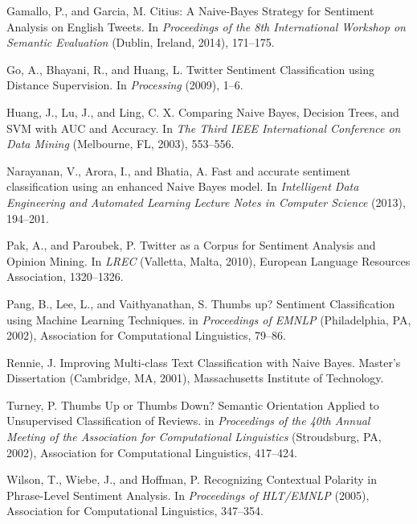 \documentclass[letter,12pt]{article}
\begin{document}
\begin{thebibliography}{9}

  Gamallo, P., and Garcia, M. Citius: A Naive-Bayes Strategy for Sentiment
  Analysis on English Tweets. In \emph{Proceedings of the 8th International
  Workshop on Semantic Evaluation} (Dublin, Ireland, 2014), 171--175.

  Go, A., Bhayani, R.,  and Huang, L. Twitter Sentiment Classification using
  Distance Supervision. In \emph{Processing} (2009), 1--6.

  Huang, J., Lu, J., and Ling, C. X. Comparing Naive Bayes, Decision Trees, and
  SVM with AUC and Accuracy. In \emph{The Third IEEE International Conference
  on Data Mining} (Melbourne, FL, 2003), 553--556.

  Narayanan, V., Arora, I., and Bhatia, A. Fast and accurate sentiment
  classification using an enhanced Naive Bayes model. In \emph{Intelligent Data
  Engineering and Automated Learning Lecture Notes in Computer Science} (2013),
  194--201.

  Pak, A., and Paroubek, P. Twitter as a Corpus for Sentiment Analysis and
  Opinion Mining. In \emph{LREC} (Valletta, Malta, 2010), European Language
  Resources Association, 1320--1326.

  Pang, B., Lee, L., and Vaithyanathan, S.
  Thumbs up? Sentiment Classification using Machine Learning Techniques.
  in \emph{Proceedings of EMNLP} (Philadelphia, PA, 2002), Association for
  Computational Linguistics, 79--86.

  Rennie, J. Improving Multi-class Text Classification with Naive Bayes.
  Master's Dissertation (Cambridge, MA, 2001), Massachusetts Institute of
  Technology.

  Turney, P.
  Thumbs Up or Thumbs Down? Semantic Orientation Applied to
  Unsupervised Classification of Reviews.
  in \emph{Proceedings of the 40th Annual Meeting of the Association for
  Computational Linguistics} (Stroudsburg, PA, 2002), Association for
  Computational Linguistics, 417--424.

  Wilson, T., Wiebe, J., and Hoffman, P. Recognizing Contextual Polarity in
  Phrase-Level Sentiment Analysis. In \emph{Proceedings of HLT/EMNLP} (2005),
  Association for Computational Linguistics, 347--354.

\end{thebibliography}
\end{document}
